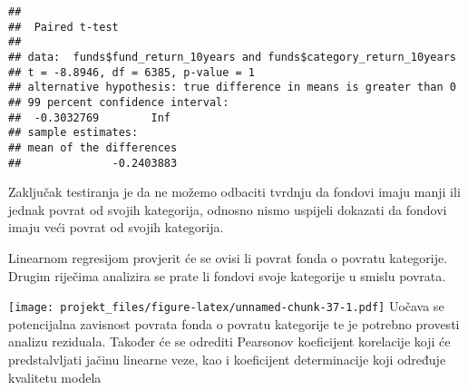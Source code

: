 \documentclass[
]{article}
\newenvironment{Shaded}{\begin{snugshade}}{\end{snugshade}}
\newcommand{\DataTypeTok}[1]{\textcolor[rgb]{0.13,0.29,0.53}{#1}}
\newcommand{\KeywordTok}[1]{\textcolor[rgb]{0.13,0.29,0.53}{\textbf{#1}}}
\newcommand{\NormalTok}[1]{#1}
\newcommand{\OperatorTok}[1]{\textcolor[rgb]{0.81,0.36,0.00}{\textbf{#1}}}
\newcommand{\StringTok}[1]{\textcolor[rgb]{0.31,0.60,0.02}{#1}}
\begin{document}
\begin{verbatim}
## 
##  Paired t-test
## 
## data:  funds$fund_return_10years and funds$category_return_10years
## t = -8.8946, df = 6385, p-value = 1
## alternative hypothesis: true difference in means is greater than 0
## 99 percent confidence interval:
##  -0.3032769        Inf
## sample estimates:
## mean of the differences 
##              -0.2403883
\end{verbatim}

Zaključak testiranja je da ne možemo odbaciti tvrdnju da fondovi imaju
manji ili jednak povrat od svojih kategorija, odnosno nismo uspijeli
dokazati da fondovi imaju veći povrat od svojih kategorija.

Linearnom regresijom provjerit će se ovisi li povrat fonda o povratu
kategorije. Drugim riječima analizira se prate li fondovi svoje
kategorije u smislu povrata.

\begin{Shaded}
\end{Shaded}

\texttt{[image: projekt\_files/figure-latex/unnamed-chunk-37-1.pdf]}
Uočava se potencijalna zavisnost povrata fonda o povratu kategorije te
je potrebno provesti analizu reziduala. Također će se odrediti Pearsonov
koeficijent korelacije koji će predstalvljati jačinu linearne veze, kao
i koeficijent determinacije koji određuje kvalitetu modela
\end{document}
